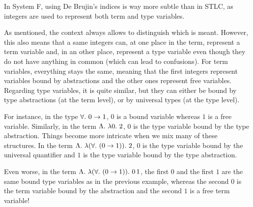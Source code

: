 In System F, using De Brujin's indices is way more subtle than in STLC, as integers are used to represent both term and type variables. 

As mentioned, the context always allows to distinguish which is meant. However, this also means that a same integers can, at one place in the term, represent a term variable and, in an other place, represent a type variable even though they do not have anything in common (which can lead to confusions).
For term variables, everything stays the same, meaning that the first integers represent variables bound by abstractions and the other ones represent free variables.
Regarding type variables, it is quite similar, but they can either be bound by type abstractions (at the term level), or by universal types (at the type level). 

For instance, in the type $\forall{}.\ {{0} \rightarrow{}{} {1}}$, $0$ is a bound variable whereas $1$ is a free variable. 
Similarly, in the term $\Lambda{}.\ {\lambda{}{0}.\ {2}}$, $0$ is the type variable bound by the type abstraction. Things become more intricate when we mix many of these structures. 
In the term $\Lambda{}.\ {\lambda{}{(\ensuremath{\forall{}.\ {({0} \rightarrow{}{} {1})}})}.\ {2}}$, $0$ is the type variable bound by the universal quantifier and $1$ is the type variable bound by the type abstraction. 

Even worse, in the term $\Lambda{}.\ {\lambda{}{(\ensuremath{\forall{}.\ {({0} \rightarrow{}{} {1})}})}.\ {{0}\,{1}}}$, the first $0$ and the first $1$ are the same bound type variables as in the previous example, whereas the second $0$ is the term variable bound by the abstraction and the second $1$ is a free term variable!
